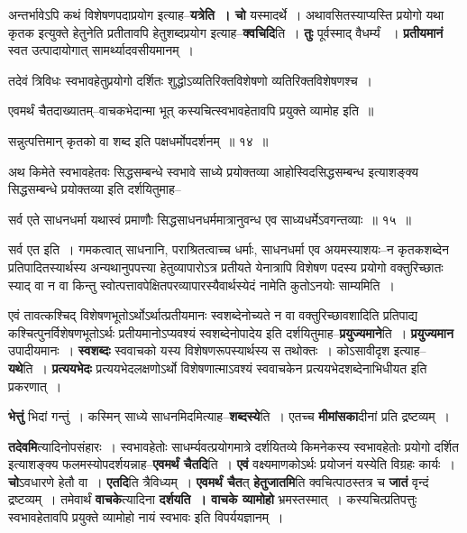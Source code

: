 \documentclass[article,12pt,a4paper]{memoir}
\begin{document}
	  \pstart अन्तर्भावेऽपि कथं विशेषणपदाप्रयोग इत्याह--\textbf{यत्रेति । चो} यस्मादर्थे । अथावसितस्याप्यस्ति प्रयोगो यथा कृतक इत्युक्ते हेतुनेति प्रतीतावपि हेतुशब्दप्रयोग इत्याह--\textbf{क्वचिदि}ति । \textbf{तुः} पूर्वस्माद् वैधर्म्यं  । \textbf{प्रतीयमानं} स्वत उत्पादायोगात् सामर्थ्यादवसीयमानम् ।  \leavevmode{} 
	  
	तदेवं त्रिविधः स्वभावहेतुप्रयोगो दर्शितः शुद्धोऽव्यतिरिक्तविशेषणो व्यतिरिक्तविशेषणश्च ।  
	  
	एवमर्थं चैतदाख्यातम्--वाचकभेदान्मा भूत् कस्यचित्स्वभावहेतावपि प्रयुक्ते व्यामोह इति ॥  
	  
	सन्नुत्पत्तिमान् कृतको वा शब्द इति पक्षधर्मोपदर्शनम् ॥ १४ ॥ 
	  
	अथ किमेते स्वभावहेतवः सिद्धसम्बन्धे स्वभावे साध्ये प्रयोक्तव्या आहोस्विदसिद्धसम्बन्ध इत्याशङ्क्य सिद्धसम्बन्धे प्रयोक्तव्या इति दर्शयितुमाह--  
	  
	सर्व एते साधनधर्मा यथास्वं प्रमाणौः सिद्धसाधनधर्ममात्रानुवन्ध एव साध्यधर्मेऽवगन्तव्याः ॥ १५ ॥ 
	  
	सर्व एत इति । गमकत्वात् साधनानि, पराश्रितत्वाच्च धर्माः, साधनधर्मा एव अयमस्याशयः--न कृतकशब्देन प्रतिपादितस्यार्थस्य अन्यथानुपपत्त्या हेतुव्यापारोऽत्र प्रतीयते येनात्रापि विशेषण \leavevmode{} पदस्य प्रयोगो वक्तुरिच्छातः स्याद् वा न वा किन्तु स्वोत्पत्तावपेक्षितपरव्यापारस्यैवार्थस्येदं नामेति कुतोऽनयोः साम्यमिति ।
	\pend
      

	  \pstart एवं तावत्कश्चिद् विशेषणभूतोऽर्थोऽर्थात्प्रतीयमानः स्वशब्देनोच्यते न वा वक्तुरिच्छावशादिति प्रतिपाद्य कश्चित्पुनर्विशेषणभूतोऽर्थः प्रतीयमानोऽप्यवश्यं स्वशब्देनोपादेय इति दर्शयितुमाह--\textbf{प्रयुज्यमाने}ति । \textbf{प्रयुज्यमान} उपादीयमानः । \textbf{स्वशब्दः} स्ववाचको यस्य विशेषणरूपस्यार्थस्य स तथोक्तः । कोऽसावीदृश इत्याह--\textbf{यथे}ति । \textbf{प्रत्ययभेदः} प्रत्ययभेदलक्षणोऽर्थो विशेषणात्माऽवश्यं स्ववाचकेन प्रत्ययभेदशब्देनाभिधीयत इति प्रकरणात् ।
	\pend
      

	  \pstart \textbf{भेत्तुं} भिदां गन्तुं । कस्मिन् साध्ये साधनमिदमित्याह--\textbf{शब्दस्ये}ति । एतच्च \textbf{मीमांसका}दीनां प्रति द्रष्टव्यम् ।
	\pend
      

	  \pstart \textbf{तदेवमि}त्यादिनोपसंहारः । स्वभावहेतोः साधर्म्यवत्प्रयोगमात्रे दर्शयितव्ये किमनेकस्य स्वभावहेतोः प्रयोगो दर्शित इत्याशङ्क्य फलमस्योपदर्शयन्नाह--\textbf{एवमर्थं चैतदि}ति । \textbf{एवं} वक्ष्यमाणकोऽर्थः प्रयोजनं यस्येति विग्रहः कार्यः । \textbf{चो}ऽवधारणे हेतौ वा । \textbf{एतदि}ति त्रैविध्यम् । \textbf{एवमर्थं चैत}त् \textbf{हेतुजातमि}ति क्वचित्पाठस्तत्र च \textbf{जातं} वृन्दं द्रष्टव्यम् । तमेवार्थं \textbf{वाचके}त्यादिना \textbf{दर्शयति । वाचके व्यामोहो} भ्रमस्तस्मात् । कस्यचित्प्रतिपत्तुः स्वभावहेतावपि प्रयुक्ते व्यामोहो नायं स्वभावः इति विपर्ययज्ञानम् ।
	\pend
      
\end{document}
